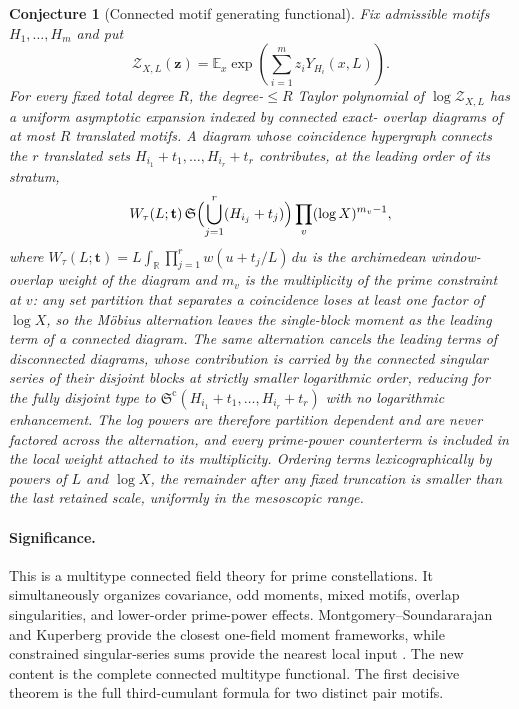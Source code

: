 \documentclass[11pt]{article}
\newtheorem{conjecture}{Conjecture}
\newcommand{\E}{\mathbb E}
\newcommand{\R}{\mathbb R}
\newcommand{\SG}{\mathfrak S}
\begin{document}
\begin{conjecture}[Connected motif generating functional]\label{c1}
Fix admissible motifs $H_1,\ldots,H_m$ and put
\[
 \mathcal Z_{X,L}(\mathbf z)=
 \E_x\exp\!\left(\sum_{i=1}^m z_iY_{H_i}(x,L)\right).
\]
For every fixed total degree $R$, the degree-$\le R$ Taylor polynomial of
$\log\mathcal Z_{X,L}$ has a uniform asymptotic expansion indexed by connected exact-
overlap diagrams of at most $R$ translated motifs.  A diagram whose coincidence hypergraph connects the $r$ translated sets
$H_{i_1}+t_1,\ldots,H_{i_r}+t_r$ contributes, at the leading order of its stratum,
\[
 W_\tau(L;\mathbf t)\,
 \SG\Bigl(\bigcup_{j=1}^r(H_{i_j}+t_j)\Bigr)
 \prod_v(\log X)^{m_v-1},
\]
where $W_\tau(L;\mathbf t)=L\int_{\R}\prod_{j=1}^rw(u+t_j/L)\,du$ is the
archimedean window-overlap weight of the diagram and
$m_v$ is the multiplicity of the prime constraint at $v$: any set partition that
separates a coincidence loses at least one factor of $\log X$, so the M\"obius
alternation leaves the single-block moment as the leading term of a connected diagram.
The same alternation cancels the leading terms of disconnected diagrams, whose
contribution is carried by the connected singular series of their disjoint blocks at
strictly smaller logarithmic order, reducing for the fully disjoint type to
$\SG^{\mathrm c}(H_{i_1}+t_1,\ldots,H_{i_r}+t_r)$ with no logarithmic enhancement.
The log powers are therefore partition dependent and are never factored across the
alternation, and every prime-power counterterm is included in the local weight attached
to its multiplicity.  Ordering
terms lexicographically by powers of $L$ and $\log X$, the remainder after any fixed
truncation is smaller than the last retained scale, uniformly in the mesoscopic range.
\end{conjecture}

\paragraph{Significance.}
This is a multitype connected field theory for prime constellations.  It simultaneously
organizes covariance, odd moments, mixed motifs, overlap singularities, and lower-order
prime-power effects.  Montgomery--Soundararajan and Kuperberg provide the closest
one-field moment frameworks, while constrained singular-series sums provide the nearest
local input \cite{MS,Kuperberg,KRR}.  The new content is the complete connected
multitype functional.  The first decisive theorem is the full third-cumulant formula for
two distinct pair motifs.
\end{document}
